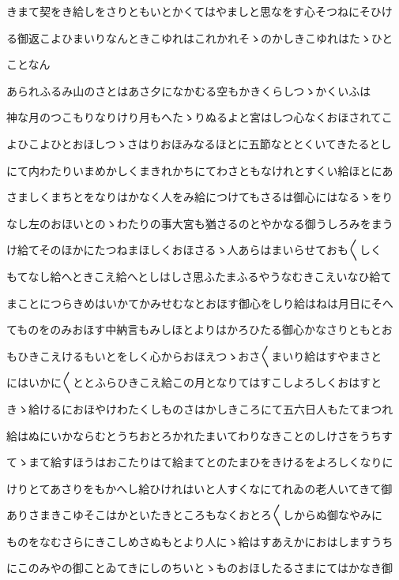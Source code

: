 \documentclass[a4paper,11pt,landscape]{ltjtarticle}
\begin{document}
\par\medskip
きまて契をき給しをさりともいとかくてはやましと思なをす心そつねにそひけ
\par\medskip
る御返こよひまいりなんときこゆれはこれかれそゝのかしきこゆれはたゝひと
\par\medskip
ことなん
\par\medskip
あられふるみ山のさとはあさ夕になかむる空もかきくらしつゝかくいふは
\par\medskip
神な月のつこもりなりけり月もへたゝりぬるよと宮はしつ心なくおほされてこ
\par\medskip
よひこよひとおほしつゝさはりおほみなるほとに五節なととくいてきたるとし
\par\medskip
にて内わたりいまめかしくまきれかちにてわさともなけれとすくい給ほとにあ
\par\medskip
さましくまちとをなりはかなく人をみ給につけてもさるは御心にはなるゝをり
\par\medskip
なし左のおほいとのゝわたりの事大宮も猶さるのとやかなる御うしろみをまう
\par\medskip
け給てそのほかにたつねまほしくおほさるゝ人あらはまいらせておも〱しく
\par\medskip
もてなし給へときこえ給へとしはしさ思ふたまふるやうなむきこえいなひ給て
\par\medskip
まことにつらきめはいかてかみせむなとおほす御心をしり給はねは月日にそへ
\par\medskip
てものをのみおほす中納言もみしほとよりはかろひたる御心かなさりともとお
\par\medskip
もひきこえけるもいとをしく心からおほえつゝおさ〱まいり給はすやまさと
\par\medskip
にはいかに〱ととふらひきこえ給この月となりてはすこしよろしくおはすと
\par\medskip
きゝ給けるにおほやけわたくしものさはかしきころにて五六日人もたてまつれ
\par\medskip
給はぬにいかならむとうちおとろかれたまいてわりなきことのしけさをうちす
\par\medskip
てゝまて給すほうはおこたりはて給まてとのたまひをきけるをよろしくなりに
\par\medskip
けりとてあさりをもかへし給ひけれはいと人すくなにてれゐの老人いてきて御
\par\medskip
ありさまきこゆそこはかといたきところもなくおとろ〱しからぬ御なやみに
\par\medskip
ものをなむさらにきこしめさぬもとより人にゝ給はすあえかにおはしますうち
\par\medskip
にこのみやの御ことゐてきにしのちいとゝものおほしたるさまにてはかなき御
\end{document}
